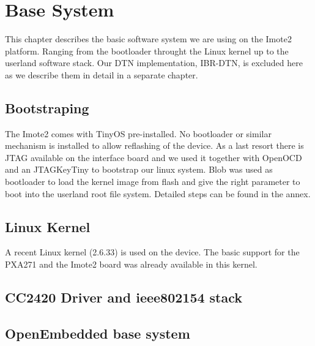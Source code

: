 \chapter{Base System}
This chapter describes the basic software system we are using on the Imote2
platform. Ranging from the bootloader throught the Linux kernel up to the
userland software stack. Our DTN implementation, IBR-DTN, is excluded here as we
describe them in detail in a separate chapter.

\section{Bootstraping}
The Imote2 comes with TinyOS pre-installed. No bootloader or similar mechanism
is installed to allow reflashing of the device. As a last resort there is JTAG
available on the interface board and we used it together with OpenOCD and an
JTAGKeyTiny to bootstrap our linux system. Blob was used as bootloader to load
the kernel image from flash and give the right parameter to boot into the
userland root file system. Detailed steps can be found in the annex.

\section{Linux Kernel}
A recent Linux kernel (2.6.33) is used on the device. The basic support for the
PXA271 and the Imote2 board was already available in this kernel.

\section{CC2420 Driver and ieee802154 stack}

\section{OpenEmbedded base system}
